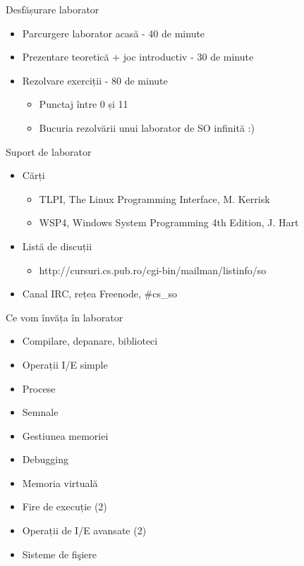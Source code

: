 \documentclass{so.cs.pub.ro}
\begin{document}
\begin{frame}{Desfășurare laborator}
	\begin{itemize}
		\item Parcurgere laborator acasă -  40 de minute
		\item Prezentare teoretică + joc introductiv - 30 de minute
		\item Rezolvare exerciții - 80 de minute
		\begin{itemize}
	    		\item Punctaj între 0 și 11
	   		 \item Bucuria rezolvării unui laborator de SO infinită :)
		\end{itemize}
	\end{itemize}
\end{frame}

\begin{frame}{Suport de laborator}
	\begin{itemize}
	\item Cărți
	\begin{itemize}
		\item TLPI, The Linux Programming Interface, M. Kerrisk
		\item WSP4, Windows System Programming 4th Edition, J. Hart
	\end{itemize}
	\item Listă de discuții
	\begin{itemize}
		\item http://cursuri.cs.pub.ro/cgi-bin/mailman/listinfo/so
	\end{itemize}
	\item Canal IRC, rețea Freenode, \#cs\_so
	\end{itemize}
\end{frame}

\begin{frame}{Ce vom învăța în laborator}
	\begin{itemize}
		\item Compilare, depanare, biblioteci
		\item Operații I/E simple
		\item Procese
		\item Semnale 
        \item Gestiunea memoriei
        \item Debugging
		\item Memoria virtuală
		\item Fire de execuție (2) 
		\item Operații de I/E avansate (2)
		\item Sisteme de fişiere
	\end{itemize}
\end{frame}
\end{document}
